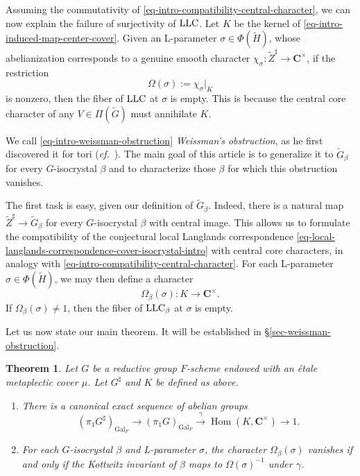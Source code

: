 \documentclass[10pt,english,reqno]{amsart}
\newcommand{\complexes}{\mathbf C}
\newcommand{\Gal}{\operatorname{Gal}}
\newcommand{\Hom}{\operatorname{Hom}}
\newcommand{\LLC}{\textnormal{LLC}}
\newtheorem{thmx}{Theorem}
\theoremstyle{definition}
\numberwithin{equation}{section}
\begin{document}
Assuming the commutativity of \eqref{eq-intro-compatibility-central-character}, we can now explain the failure of surjectivity of $\LLC$. Let $K$ be the kernel of \eqref{eq-intro-induced-map-center-cover}. Given an L-parameter $\sigma \in \Phi(\widetilde H)$, whose abelianization corresponds to a genuine smooth character $\chi_{\sigma} : \widetilde Z^{\sharp} \rightarrow \complexes^{\times}$, if the restriction
\begin{equation}
\label{eq-intro-weissman-obstruction}
\Omega(\sigma) := \chi_{\sigma} |_K
\end{equation}
is nonzero, then the fiber of $\LLC$ at $\sigma$ is empty. This is because the central core character of any $V \in \Pi(\widetilde G)$ must annihilate $K$.

We call \eqref{eq-intro-weissman-obstruction} \emph{Weissman's obstruction}, as he first discovered it for tori (\emph{cf.}~\cite{MR2485462, MR3595494}). The main goal of this article is to generalize it to $\widetilde G_{\beta}$ for every $G$-isocrystal $\beta$ and to characterize those $\beta$ for which this obstruction vanishes.

The first task is easy, given our definition of $\widetilde G_{\beta}$. Indeed, there is a natural map $\widetilde Z^{\sharp} \rightarrow \widetilde G_{\beta}$ for every $G$-isocrystal $\beta$ with central image. This allows us to formulate the compatibility of the conjectural local Langlands correspondence \eqref{eq-local-langlands-correspondence-cover-isocrystal-intro} with central core characters, in analogy with \eqref{eq-intro-compatibility-central-character}. For each L-parameter $\sigma \in \Phi(\widetilde H)$, we may then define a character
$$
\Omega_{\beta}(\sigma) : K \rightarrow \complexes^{\times}.
$$
If $\Omega_{\beta}(\sigma)\neq 1$, then the fiber of $\LLC_{\beta}$ at $\sigma$ is empty.

Let us now state our main theorem. It will be established in \S\ref{sec-weissman-obstruction}.


\begin{thmx}
\label{thmx-kottwitz-invariant}
Let $G$ be a reductive group $F$-scheme endowed with an \'etale metaplectic cover $\mu$. Let $G^{\sharp}$ and $K$ be defined as above.
\begin{enumerate}
	\item There is a canonical exact sequence of abelian groups
	$$
	(\pi_1G^{\sharp})_{\Gal_F} \rightarrow (\pi_1G)_{\Gal_F} \xrightarrow{\gamma} \Hom(K, \complexes^{\times}) \rightarrow 1.
	$$
	
	\item For each $G$-isocrystal $\beta$ and L-parameter $\sigma$, the character $\Omega_{\beta}(\sigma)$ vanishes if and only if the Kottwitz invariant of $\beta$ maps to $\Omega(\sigma)^{-1}$ under $\gamma$.
\end{enumerate}
\end{thmx}
\end{document}
